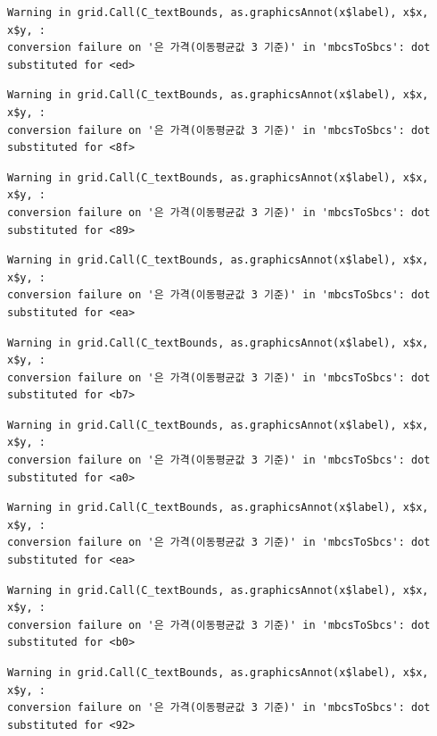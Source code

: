 \documentclass[
  letterpaper,
  DIV=11,
  numbers=noendperiod]{scrreprt}
\begin{document}
\begin{verbatim}
Warning in grid.Call(C_textBounds, as.graphicsAnnot(x$label), x$x, x$y, :
conversion failure on '은 가격(이동평균값 3 기준)' in 'mbcsToSbcs': dot
substituted for <ed>
\end{verbatim}

\begin{verbatim}
Warning in grid.Call(C_textBounds, as.graphicsAnnot(x$label), x$x, x$y, :
conversion failure on '은 가격(이동평균값 3 기준)' in 'mbcsToSbcs': dot
substituted for <8f>
\end{verbatim}

\begin{verbatim}
Warning in grid.Call(C_textBounds, as.graphicsAnnot(x$label), x$x, x$y, :
conversion failure on '은 가격(이동평균값 3 기준)' in 'mbcsToSbcs': dot
substituted for <89>
\end{verbatim}

\begin{verbatim}
Warning in grid.Call(C_textBounds, as.graphicsAnnot(x$label), x$x, x$y, :
conversion failure on '은 가격(이동평균값 3 기준)' in 'mbcsToSbcs': dot
substituted for <ea>
\end{verbatim}

\begin{verbatim}
Warning in grid.Call(C_textBounds, as.graphicsAnnot(x$label), x$x, x$y, :
conversion failure on '은 가격(이동평균값 3 기준)' in 'mbcsToSbcs': dot
substituted for <b7>
\end{verbatim}

\begin{verbatim}
Warning in grid.Call(C_textBounds, as.graphicsAnnot(x$label), x$x, x$y, :
conversion failure on '은 가격(이동평균값 3 기준)' in 'mbcsToSbcs': dot
substituted for <a0>
\end{verbatim}

\begin{verbatim}
Warning in grid.Call(C_textBounds, as.graphicsAnnot(x$label), x$x, x$y, :
conversion failure on '은 가격(이동평균값 3 기준)' in 'mbcsToSbcs': dot
substituted for <ea>
\end{verbatim}

\begin{verbatim}
Warning in grid.Call(C_textBounds, as.graphicsAnnot(x$label), x$x, x$y, :
conversion failure on '은 가격(이동평균값 3 기준)' in 'mbcsToSbcs': dot
substituted for <b0>
\end{verbatim}

\begin{verbatim}
Warning in grid.Call(C_textBounds, as.graphicsAnnot(x$label), x$x, x$y, :
conversion failure on '은 가격(이동평균값 3 기준)' in 'mbcsToSbcs': dot
substituted for <92>
\end{verbatim}
\end{document}
